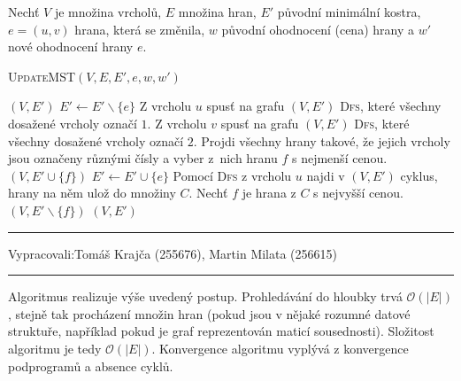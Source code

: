 \documentclass[12pt]{article}
\newcommand{\la}{\leftarrow}
\renewcommand{\O}{\mathcal{O}}
\newcommand{\zadani}[2]{
{\large
\noindent {\bf IB108 \hfill{} Sada #1, Příklad #2 \\[-4mm]}
\noindent\hrule
\vspace{2mm}
\noindent Vypracovali:\hfill{}Tomáš Krajča (255676), Martin Milata (256615)
\vspace{3mm}
\hrule
\bigskip\bigskip}
}
\begin{document}
Nechť $V$ je množina vrcholů, $E$ množina hran, $E'$ původní minimální kostra, $e=(u,v)$ hrana, která
se změnila, $w$ původní ohodnocení (cena) hrany a $w'$ nové ohodnocení hrany $e$.

\begin{algorithm}
\textsc{UpdateMST}$(V, E, E', e, w, w')$
\begin{algorithmic}[1]
	\RETURN $(V,E')$
	\STATE $E' \la E' \smallsetminus \{e\}$
	\STATE Z vrcholu $u$ spusť na grafu $(V,E')$ \textsc{Dfs}, které všechny dosažené vrcholy označí $1$.
	\STATE Z vrcholu $v$ spusť na grafu $(V,E')$ \textsc{Dfs}, které všechny dosažené vrcholy označí $2$.
	\STATE Projdi všechny hrany takové, že jejich vrcholy jsou označeny různými čísly a vyber z~nich hranu $f$ s nejmenší cenou.
	\RETURN $(V,E' \cup \{f\})$
	\STATE $E' \la E' \cup \{e\}$
	\STATE Pomocí \textsc{Dfs} z vrcholu $u$ najdi v $(V,E')$ cyklus, hrany na něm ulož do množiny $C$.
	\STATE Nechť $f$ je hrana z $C$ s nejvyšší cenou.
	\RETURN $(V,E' \smallsetminus \{f\})$
	\RETURN $(V,E')$
\ENDIF
\end{algorithmic}
\end{algorithm}

\clearpage
\zadani{3}{4}
\noindent
Algoritmus realizuje výše uvedený postup. Prohledávání do hloubky trvá $\O(|E|)$, stejně tak procházení množin hran
(pokud jsou v nějaké rozumné datové struktuře, například pokud je graf reprezentován maticí sousednosti). Složitost
algoritmu je tedy $\O(|E|)$. Konvergence algoritmu vyplývá z konvergence podprogramů a absence
cyklů.
\end{document}
